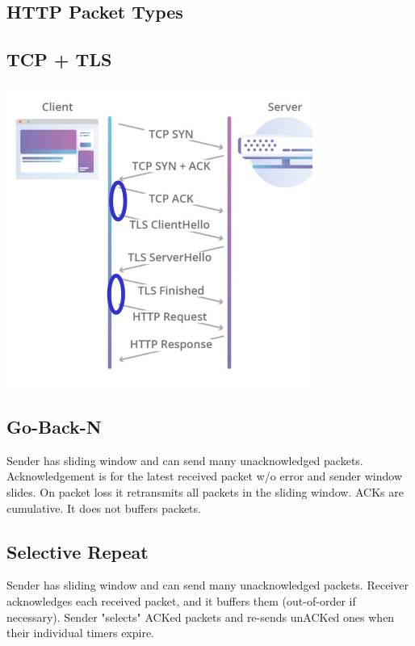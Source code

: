 \subsection*{HTTP Packet Types}
\subsection*{TCP + TLS}
\begin{center}
  \includegraphics[scale=0.4]{images/tcp-n-tls.png}
\end{center}
\subsection*{Go-Back-N}
Sender has sliding window and can send many unacknowledged packets.
Acknowledgement is for the latest received packet w/o error and sender
window slides. On packet loss it retransmits all packets in the sliding
window. ACKs are cumulative. It does not buffers packets.
\subsection*{Selective Repeat}
Sender has sliding window and can send many unacknowledged packets.
Receiver acknowledges each received packet, and it buffers them
(out-of-order if necessary). Sender "selects" ACKed packets and re-sends
unACKed ones when their individual timers expire.